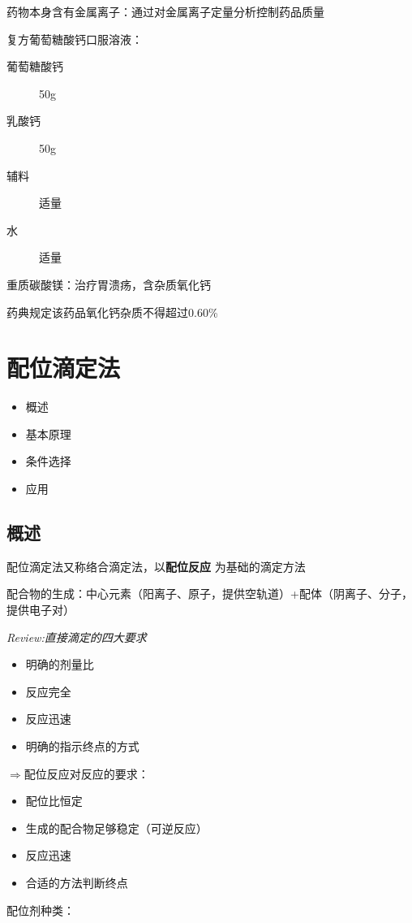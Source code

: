 \begin{notation}
    药物本身含有金属离子：通过对金属离子定量分析控制药品质量
\end{notation}
\begin{eg}
    复方葡萄糖酸钙口服溶液：
    \begin{description}
        \item[葡萄糖酸钙] 50g
        \item[乳酸钙] 50g
        \item[辅料] 适量
        \item [水] 适量
    \end{description}
\end{eg}
\begin{eg}
    重质碳酸镁：治疗胃溃疡，含杂质氧化钙

    药典规定该药品氧化钙杂质不得超过0.60\%
\end{eg}
\section{配位滴定法}%
\label{sec:配位滴定法}
\begin{itemize}
    \item 概述
    \item 基本原理
    \item 条件选择
    \item 应用
\end{itemize}
\subsection{概述}%
\label{sub:概述：配位滴定法}
\begin{defi}
    配位滴定法又称络合滴定法，以\textbf{配位反应} 为基础的滴定方法
\end{defi} 
配合物的生成：中心元素（阳离子、原子，提供空轨道）+配体（阴离子、分子，提供电子对）
\begin{notation}
    \textit{Review:直接滴定的四大要求}
    \begin{itemize}
        \item 明确的剂量比
        \item 反应完全
        \item 反应迅速
        \item 明确的指示终点的方式
    \end{itemize}
    $\Rightarrow $配位反应对反应的要求：
    \begin{itemize}
        \item 配位比恒定
        \item 生成的配合物足够稳定（可逆反应）
        \item 反应迅速
        \item 合适的方法判断终点
    \end{itemize}
\end{notation}
配位剂种类：

